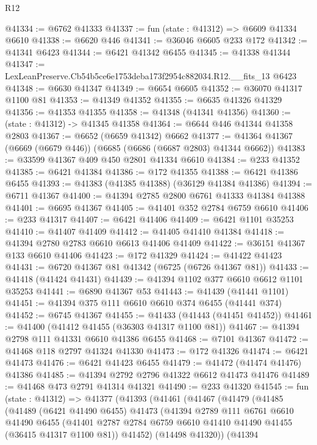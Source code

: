 \begin{lexlean}{R12}
\begin{coremodule}
@41334 := @6762 @41333
@41337 := fun (state : @41312) => @6609 @41334 @6610
@41338 := @6620 @446
@41341 := @36046 @6605 @233 @172
@41342 := @41341 @6423
@41344 := @6421 @41342 @6455
@41345 := @41338 @41344
@41347 := LexLeanPreserve.Cb54b5ce6e1753deba173f2954c882034.R12.__fits_13 @6423
@41348 := @6630 @41347
@41349 := @6654 @6605
@41352 := @36070 @41317 @1100 @81
@41353 := @41349 @41352
@41355 := @6635 @41326 @41329
@41356 := @41353 @41355
@41358 := @41348 (@41341 @41356)
@41360 := (state : @41312) -> @41345 @41358
@41364 := @6644 @446 @41344 @41358 @2803
@41367 := @6652 (@6659 @41342) @6662
@41377 := @41364 @41367 (@6669 (@6679 @446)) (@6685 (@6686 (@6687 @2803) @41344 @6662))
@41383 := @33599 @41367 @409 @450 @2801 @41334 @6610
@41384 := @233 @41352
@41385 := @6421 @41384
@41386 := @172 @41355
@41388 := @6421 @41386 @6455
@41393 := @41383 (@41385 @41388) (@36129 @41384 @41386)
@41394 := @6711 @41367
@41400 := @41394 @2785 @2800 @6761 @41333 @41384 @41388
@41401 := @6695 @41367
@41405 := @41401 @352 @2784 @6759 @6610
@41406 := @233 @41317
@41407 := @6421 @41406
@41409 := @6421 @1101 @35253
@41410 := @41407 @41409
@41412 := @41405 @41410 @41384
@41418 := @41394 @2780 @2783 @6610 @6613 @41406 @41409
@41422 := @36151 @41367 @133 @6610 @41406
@41423 := @172 @41329
@41424 := @41422 @41423
@41431 := @6720 @41367 @81 @41342 (@6725 (@6726 @41367 @81))
@41433 := @41418 (@41424 @41431)
@41439 := @41394 @1102 @377 @6610 @6612 @1101 @35253
@41441 := @6890 @41367 @53
@41443 := @41439 (@41441 @1101)
@41451 := @41394 @375 @111 @6610 @6610 @374 @6455 (@41441 @374)
@41452 := @6745 @41367
@41455 := @41433 (@41443 (@41451 @41452))
@41461 := @41400 (@41412 @41455 (@36303 @41317 @1100 @81))
@41467 := @41394 @2798 @111 @41331 @6610 @41386 @6455
@41468 := @7101 @41367
@41472 := @41468 @118 @2797 @41324 @41330
@41473 := @172 @41326
@41474 := @6421 @41473
@41476 := @6421 @41423 @6455
@41479 := @41472 (@41474 @41476) @41386
@41485 := @41394 @2792 @2796 @41322 @6612 @41473 @41476
@41489 := @41468 @473 @2791 @41314 @41321
@41490 := @233 @41320
@41545 := fun (state : @41312) =>
  @41377
    (@41393
      (@41461
        (@41467
          (@41479
            (@41485
              (@41489
                (@6421 @41490 @6455)
                @41473
                (@41394
                  @2789
                  @111
                  @6761
                  @6610
                  @41490
                  @6455
                  (@41401 @2787 @2784 @6759 @6610 @41410 @41490 @41455 (@36415 @41317 @1100 @81))
                  @41452)
                (@14498 @41320))
              (@41394

\end{coremodule}
\end{lexlean}
